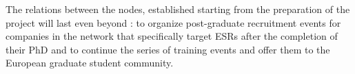 The relations between the nodes, established starting from the preparation of the project will last even beyond \acronym: 
to organize post-graduate recruitment events for companies in the network that specifically target \acronym ESRs after the completion of their PhD and to continue the series of training events and offer them to the European graduate student community.  



